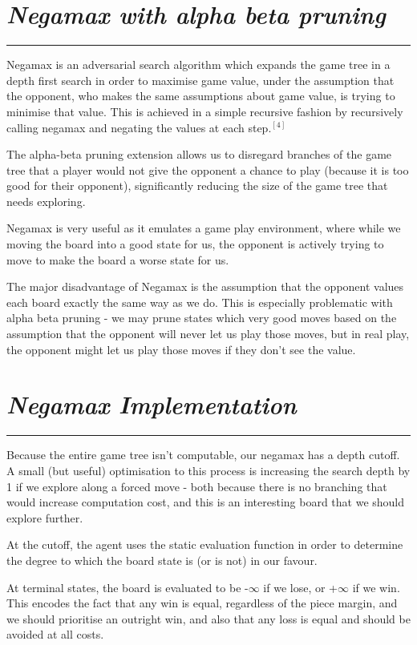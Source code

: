 \documentclass[10pt]{report}
\begin{document}
\begin{multicols}{2}
\section*{\emph{Negamax with alpha beta pruning}}
\hrule

Negamax is an adversarial search algorithm which expands the game tree in a depth first search in order to maximise game value, under the assumption that the opponent, who makes the same assumptions about game value, is trying to minimise that value. This is achieved in a simple recursive fashion by recursively calling negamax and negating the values at each step.$^{[4]}$

The alpha-beta pruning extension allows us to disregard branches of the game tree that a player would not give the opponent a chance to play (because it is too good for their opponent), significantly reducing the size of the game tree that needs exploring.

Negamax is very useful as it emulates a game play environment, where while we moving the board into a good state for us, the opponent is actively trying to move to make the board a worse state for us.

The major disadvantage of Negamax is the assumption that the opponent values each board exactly the same way as we do. This is especially problematic with alpha beta pruning - we may prune states which very good moves based on the assumption that the opponent will never let us play those moves, but in real play, the opponent might let us play those moves if they don't see the value.
\section*{\emph{\textmd{Negamax Implementation}}}
\hrule

Because the entire game tree isn't computable, our negamax has a depth cutoff. A small (but useful) optimisation to this process is increasing the search depth by 1 if we explore along a forced move - both because there is no branching that would increase computation cost, and this is an interesting board that we should explore further.

At the cutoff, the agent uses the static evaluation function in order to determine the degree to which the board state is (or is not) in our favour.

At terminal states, the board is evaluated to be -$\infty$ if we lose, or +$\infty$ if we win. This encodes the fact that any win is equal, regardless of the piece margin, and we should prioritise an outright win, and also that any loss is equal and should be avoided at all costs.


\end{multicols}
\end{document}
